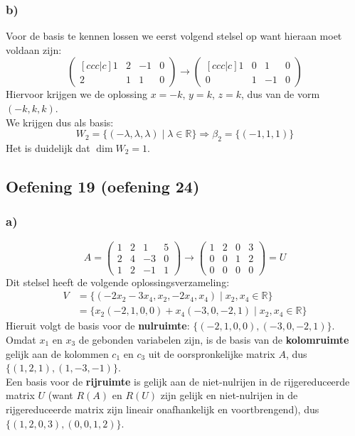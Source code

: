 \documentclass[lineaire_algebra_oplossingen.tex]{subfiles}
\begin{document}
\subsubsection*{b)}
Voor de basis te kennen lossen we eerst volgend stelsel op want hieraan moet voldaan zijn:
\[
\begin{pmatrix}[ccc|c]
1 & 2 & -1 & 0 \\
2 & 1 &  1 & 0
\end{pmatrix}
\longrightarrow
\begin{pmatrix}[ccc|c]
1 & 0 &  1 & 0 \\
0 & 1 & -1 & 0
\end{pmatrix}
\]
Hiervoor krijgen we de oplossing $x=-k$, $y= k$, $z=k$, dus van de vorm $(-k,k,k)$.\\
We krijgen dus als basis:
\[
W_2 = \{(-\lambda, \lambda, \lambda)\mid\lambda \in \mathbb{R}\}
\Longrightarrow
\beta_2 = \{ (-1,1,1) \}
\]
Het is duidelijk dat $\dim W_2 = 1$.

\subsection{Oefening 19 (oefening 24)}
\subsubsection*{a)}
\[
A =
\begin{pmatrix}
1 & 2 &  1 & 5 \\
2 & 4 & -3 & 0 \\
1 & 2 & -1 & 1
\end{pmatrix}
\longrightarrow
\begin{pmatrix}
1 & 2 & 0 & 3 \\
0 & 0 & 1 & 2 \\
0 & 0 & 0 & 0
\end{pmatrix}
= U
\]
Dit stelsel heeft de volgende oplossingsverzameling:
\begin{align*}
V
&= \{ (-2x_2-3x_4,x_2,-2x_4,x_4) \mid x_2,x_4 \in \mathbb{R} \} \\
&= \{ x_2(-2,1,0,0) + x_4(-3,0,-2,1) \mid x_2,x_4 \in \mathbb{R} \}
\end{align*}
Hieruit volgt de basis voor de \textbf{nulruimte}: $\{ (-2,1,0,0), (-3,0,-2,1) \}$.\\
Omdat $x_1$ en $x_3$ de gebonden variabelen zijn, is de basis van de \textbf{kolomruimte} gelijk aan de kolommen $c_1$ en $c_3$ uit de oorspronkelijke matrix $A$, dus $\{(1,2,1),(1,-3,-1)\}$.\\
Een basis voor de \textbf{rijruimte} is gelijk aan de niet-nulrijen in de rijgereduceerde matrix $U$ (want $R(A)$ en $R(U)$ zijn gelijk en niet-nulrijen in de rijgereduceerde matrix zijn lineair onafhankelijk en voortbrengend), dus $\{(1,2,0,3),(0,0,1,2)\}$.
\end{document}
